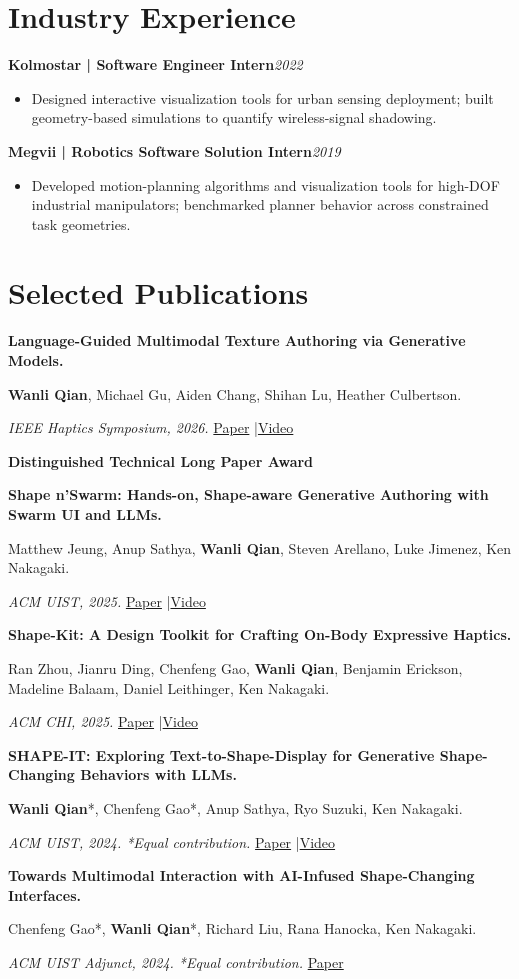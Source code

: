 \documentclass[11pt,letterpaper]{article}
\newcommand{\role}[2]{\textbf{#1}\hfill\textit{#2}\par}
\newcommand{\pub}[3]{\textbf{#1}\par #2\par #3\par\vspace{7pt}}
\begin{document}
\section*{Industry Experience}
\role{Kolmostar | Software Engineer Intern}{2022}
\begin{itemize}
\item Designed interactive visualization tools for urban sensing deployment; built geometry-based simulations to quantify wireless-signal shadowing.
\end{itemize}
\vspace{3pt}
\role{Megvii | Robotics Software Solution Intern}{2019}
\begin{itemize}
\item Developed motion-planning algorithms and visualization tools for high-DOF industrial manipulators; benchmarked planner behavior across constrained task geometries.
\end{itemize}
\newpage
\section*{Selected Publications}
\pub{Language-Guided Multimodal Texture Authoring via Generative Models.}{\textbf{Wanli Qian}, Michael Gu, Aiden Chang, Shihan Lu, Heather Culbertson.}{\textit{IEEE Haptics Symposium, 2026.} \enspace \href{https://arxiv.org/abs/2604.06489}{Paper} \enspace|\enspace \href{https://youtu.be/f5vz52uPw-4}{Video}\par\textbf{Distinguished Technical Long Paper Award}}
\pub{Shape n'Swarm: Hands-on, Shape-aware Generative Authoring with Swarm UI and LLMs.}{Matthew Jeung, Anup Sathya, \textbf{Wanli Qian}, Steven Arellano, Luke Jimenez, Ken Nakagaki.}{\textit{ACM UIST, 2025.} \enspace \href{https://dl.acm.org/doi/10.1145/3746059.3747781}{Paper} \enspace|\enspace \href{https://www.youtube.com/watch?v=5u0M9yL7tyY}{Video}}
\pub{Shape-Kit: A Design Toolkit for Crafting On-Body Expressive Haptics.}{Ran Zhou, Jianru Ding, Chenfeng Gao, \textbf{Wanli Qian}, Benjamin Erickson, Madeline Balaam, Daniel Leithinger, Ken Nakagaki.}{\textit{ACM CHI, 2025.} \enspace \href{https://dl.acm.org/doi/10.1145/3706599.3721280}{Paper} \enspace|\enspace \href{https://www.youtube.com/watch?v=W_rZg8f6lZM}{Video}}
\pub{SHAPE-IT: Exploring Text-to-Shape-Display for Generative Shape-Changing Behaviors with LLMs.}{\textbf{Wanli Qian}*, Chenfeng Gao*, Anup Sathya, Ryo Suzuki, Ken Nakagaki.}{\textit{ACM UIST, 2024. *Equal contribution.} \enspace \href{https://dl.acm.org/doi/10.1145/3654777.3676348}{Paper} \enspace|\enspace \href{https://www.youtube.com/watch?v=2NxzOBc7AdQ}{Video}}
\pub{Towards Multimodal Interaction with AI-Infused Shape-Changing Interfaces.}{Chenfeng Gao*, \textbf{Wanli Qian}*, Richard Liu, Rana Hanocka, Ken Nakagaki.}{\textit{ACM UIST Adjunct, 2024. *Equal contribution.} \enspace \href{https://dl.acm.org/doi/10.1145/3672539.3686315}{Paper}}
\end{document}
